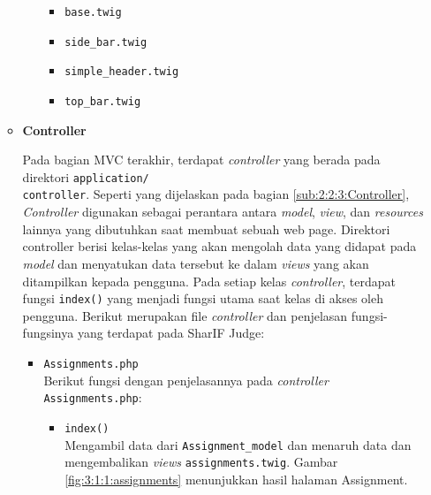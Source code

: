 \documentclass[a4paper,twoside]{article}
\begin{document}
\begin{enumerate}
\begin{itemize}
\begin{itemize}
			                  \begin{itemize}
				                  \item \verb|base.twig|
				                  \item \verb|side_bar.twig|
				                  \item \verb|simple_header.twig|
				                  \item \verb|top_bar.twig|
			                  \end{itemize}

		            \end{itemize}

		            \newpage

		      \item \textbf{Controller}
		            \label{sub:3:1:1:controller}

		            Pada bagian MVC terakhir, terdapat \textit{controller} yang berada pada direktori \verb|application/| \\ \verb|controller|. Seperti yang dijelaskan pada bagian \ref{sub:2:2:3:Controller}, \textit{Controller} digunakan sebagai perantara antara \textit{model}, \textit{view}, dan \textit{resources} lainnya yang dibutuhkan saat membuat sebuah web page. Direktori controller berisi kelas-kelas yang akan mengolah data yang didapat pada \textit{model} dan menyatukan data tersebut ke dalam \textit{views} yang akan ditampilkan kepada pengguna. Pada setiap kelas \textit{controller}, terdapat fungsi \verb|index()| yang menjadi fungsi utama saat kelas di akses oleh pengguna. Berikut merupakan file \textit{controller} dan penjelasan fungsi-fungsinya yang terdapat pada SharIF Judge:

		            \begin{itemize}
			            \item \verb|Assignments.php| \\
			                  Berikut fungsi dengan penjelasannya pada \textit{controller} \verb|Assignments.php|:

			                  \begin{itemize}
				                  \item \verb|index()| \\
				                        Mengambil data dari \verb|Assignment_model| dan menaruh data dan mengembalikan \textit{views} \verb|assignments.twig|. Gambar \ref{fig:3:1:1:assignments} menunjukkan hasil halaman Assignment.


\end{itemize}
\end{itemize}
\end{itemize}
\end{enumerate}
\end{document}
